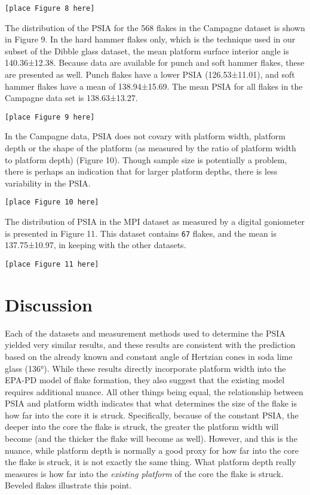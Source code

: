 \documentclass[10pt,letterpaper]{article}
\begin{document}
\begin{verbatim}
[place Figure 8 here]
\end{verbatim}

The distribution of the PSIA for the 568 flakes in the Campagne dataset
is shown in Figure 9. In the hard hammer flakes only, which is the
technique used in our subset of the Dibble glass dataset, the mean
platform surface interior angle is 140.36±12.38. Because data are
available for punch and soft hammer flakes, these are presented as well.
Punch flakes have a lower PSIA (126.53±11.01), and soft hammer flakes
have a mean of 138.94±15.69. The mean PSIA for all flakes in the
Campagne data set is 138.63±13.27.

\begin{verbatim}
[place Figure 9 here]
\end{verbatim}

In the Campagne data, PSIA does not covary with platform width, platform
depth or the shape of the platform (as measured by the ratio of platform
width to platform depth) (Figure 10). Though sample size is potentially
a problem, there is perhaps an indication that for larger platform
depths, there is less variability in the PSIA.

\begin{verbatim}
[place Figure 10 here]
\end{verbatim}

The distribution of PSIA in the MPI dataset as measured by a digital
goniometer is presented in Figure 11. This dataset contains \texttt{67}
flakes, and the mean is 137.75±10.97, in keeping with the other
datasets.

\begin{verbatim}
[place Figure 11 here]
\end{verbatim}

\hypertarget{discussion}{%
\section{Discussion}\label{discussion}}

Each of the datasets and measurement methods used to determine the PSIA
yielded very similar results, and these results are consistent with the
prediction based on the already known and constant angle of Hertzian
cones in soda lime glass (136°). While these results directly
incorporate platform width into the EPA-PD model of flake formation,
they also suggest that the existing model requires additional nuance.
All other things being equal, the relationship between PSIA and platform
width indicates that what determines the size of the flake is how far
into the core it is struck. Specifically, because of the constant PSIA,
the deeper into the core the flake is struck, the greater the platform
width will become (and the thicker the flake will become as well).
However, and this is the nuance, while platform depth is normally a good
proxy for how far into the core the flake is struck, it is not exactly
the same thing. What platform depth really measures is how far into the
\emph{existing platform} of the core the flake is struck. Beveled flakes
illustrate this point.
\end{document}
